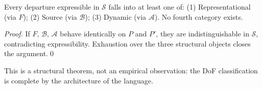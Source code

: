 \begin{theorem}\label{thm:dof-completeness}
Every departure expressible in $\mathcal{S}$ falls into at least one of:
(1) Representational (via $F$); (2) Source (via $\mathcal{B}$); (3) Dynamic (via $\mathcal{A}$).
No fourth category exists.
\end{theorem}

\begin{proof}
If $F$, $\mathcal{B}$, $\mathcal{A}$ behave identically on $P$ and $P'$,
they are indistinguishable in $\mathcal{S}$, contradicting expressibility.
Exhaustion over the three structural objects closes the argument.\qed
\end{proof}
\begin{remark}
This is a structural theorem, not an empirical observation:
the DoF classification is complete by the architecture of the language.
\end{remark}
